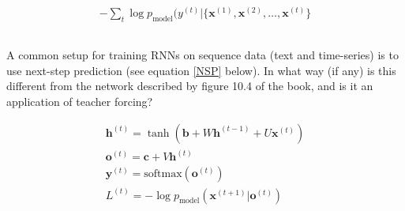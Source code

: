 \documentclass[a4paper]{report}
\renewcommand{\vec}[1]{{\boldsymbol{#1}}}
\newcommand{\tvec}[2]{{\vec{#1}^{(#2)}}}
\begin{document}
  \begin{equation}
    \label{NLL}
    \begin{gathered}
      -\sum_t \log p_{\text{model}}(y^{(t)} | \{\tvec{x}{1}, \tvec{x}{2}, \ldots, \tvec{x}{t}\}
\end{gathered}
\end{equation}

  \subsection{}
  A common setup for training RNNs on sequence data (text and time-series) is to use next-step prediction (see equation \ref{NSP} below). In what way (if any) is this different from the network described by figure 10.4 of the book, and is it an application of teacher forcing?

  \begin{equation}
    \label{NSP}
    \begin{gathered}
      \tvec{h}{t} = \tanh(\vec{b} + W \tvec{h}{t-1} + U\tvec{x}{t})\\
    \tvec{o}{t} = \vec{c} + V\tvec{h}{t}\\
    \tvec{y}{t} = \text{softmax}(\tvec{o}{t})\\
    L^{(t)} = -\log p_{\text{model}}(\tvec{x}{t+1} | \tvec{o}{t})
\end{gathered}
\end{equation}
\end{document}
